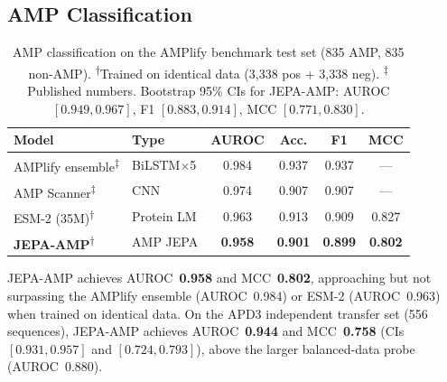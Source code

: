 \subsection{AMP Classification}
\label{sec:res_amp}

\begin{table}[h]
\centering
\small
\caption{AMP classification on the AMPlify benchmark test set (835 AMP,
  835 non-AMP).
  \textsuperscript{$\dagger$}Trained on identical data (3{,}338 pos + 3{,}338 neg).
  \textsuperscript{$\ddagger$}Published numbers.
  Bootstrap 95\% CIs for JEPA-AMP: AUROC $[0.949, 0.967]$, F1 $[0.883, 0.914]$,
  MCC $[0.771, 0.830]$.}
\label{tab:amp_bench}
\begin{tabular}{llcccc}
\toprule
\textbf{Model} & \textbf{Type} & \textbf{AUROC} & \textbf{Acc.} & \textbf{F1} & \textbf{MCC} \\
\midrule
AMPlify ensemble\textsuperscript{$\ddagger$}     & BiLSTM$\times$5  & 0.984 & 0.937 & 0.937 & --- \\
AMP Scanner\textsuperscript{$\ddagger$}          & CNN              & 0.974 & 0.907 & 0.907 & --- \\
ESM-2 (35M)\textsuperscript{$\dagger$}           & Protein LM       & 0.963 & 0.913 & 0.909 & 0.827 \\
\textbf{JEPA-AMP}\textsuperscript{$\dagger$}     & AMP JEPA         & \textbf{0.958} & \textbf{0.901} & \textbf{0.899} & \textbf{0.802} \\
\bottomrule
\end{tabular}
\end{table}

JEPA-AMP achieves AUROC~\textbf{0.958} and MCC~\textbf{0.802}, approaching but
not surpassing the AMPlify ensemble (AUROC~0.984) or ESM-2 (AUROC~0.963) when
trained on identical data.
On the APD3 independent transfer set (556 sequences), JEPA-AMP achieves
AUROC~\textbf{0.944} and MCC~\textbf{0.758} (CIs $[0.931, 0.957]$ and
$[0.724, 0.793]$), above the larger balanced-data probe (AUROC~0.880).

